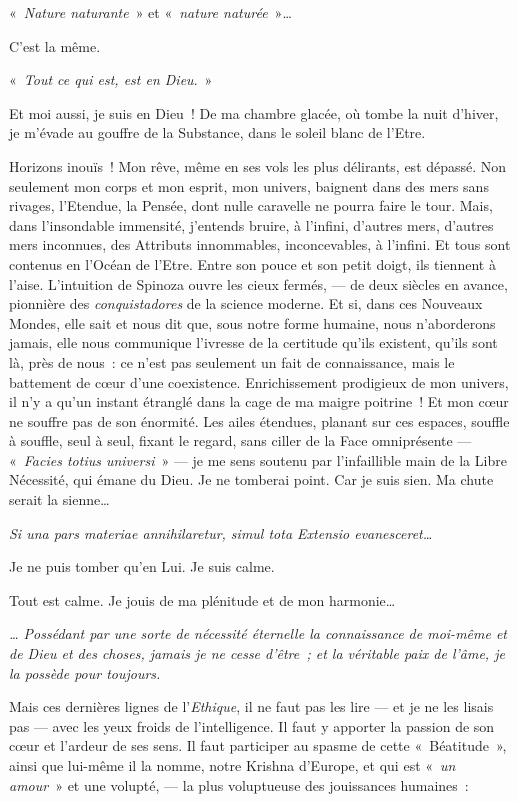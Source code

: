 «~\emph{Nature naturante}~» et «~\emph{nature naturée}~»\ldots{}

C'est la même.

«~\emph{Tout ce qui est, est en Dieu}.~»

Et moi aussi, je suis en Dieu~! De ma chambre glacée, où tombe la nuit
d'hiver, je m'évade au gouffre de la Substance, dans le soleil blanc de
l'Etre.

Horizons inouïs~! Mon rêve, même en ses vols les plus délirants, est
dépassé. Non seulement mon corps et mon esprit, mon univers, baignent
dans des mers sans rivages, l'Etendue, la Pensée, dont nulle caravelle
ne pourra faire le tour. Mais, dans l'insondable immensité, j'entends
bruire, à l'infini, d'autres mers, d'autres mers inconnues, des
Attributs innommables, inconcevables, à l'infini. Et tous sont contenus
en l'Océan de l'Etre. Entre son pouce et son petit doigt, ils tiennent à
l'aise. L'intuition de Spinoza ouvre les cieux fermés, --- de deux
siècles en avance, pionnière des \emph{conquistadores} de la science
moderne. Et si, dans ces Nouveaux Mondes, elle sait et nous dit que,
sous notre forme humaine, nous n'aborderons jamais, elle nous communique
l'ivresse de la certitude qu'ils existent, qu'ils sont là, près de
nous~: ce n'est pas seulement un fait de connaissance, mais le battement
de c\oe ur d'une coexistence. Enrichissement prodigieux de mon univers, il
n'y a qu'un instant étranglé dans la cage de ma maigre poitrine~! Et mon
c\oe ur ne souffre pas de son énormité. Les ailes étendues, planant sur
ces espaces, souffle à souffle, seul à seul, fixant le regard, sans
ciller de la Face omniprésente --- «~\emph{Facies totius
universi}~» --- je me sens soutenu par
l'infaillible main de la Libre Nécessité, qui émane du Dieu. Je ne
tomberai point. Car je suis sien. Ma chute serait la sienne\ldots{}

\emph{Si una pars materiae annihilaretur, simul tota Extensio
evanesceret\ldots{}}

Je ne puis tomber qu'en Lui. Je suis calme.

\quebra

Tout est calme. Je jouis de ma plénitude et de mon harmonie\ldots{}

\emph{\ldots{} Possédant par une sorte de nécessité éternelle la connaissance
de moi-même et de Dieu et des choses, jamais je ne cesse d'être~; et la
véritable paix de l'âme, je la possède pour toujours.}

Mais ces dernières lignes de l'\emph{Ethique}, il ne faut pas les lire
--- et je ne les lisais pas --- avec les yeux froids de l'intelligence. Il
faut y apporter la passion de son c\oe ur et l'ardeur de ses sens. Il faut
participer au spasme de cette «~Béatitude~», ainsi que lui-même il la
nomme, notre Krishna d'Europe, et qui est «~\emph{un amour}~» et une volupté, --- la plus voluptueuse
des jouissances humaines~:

